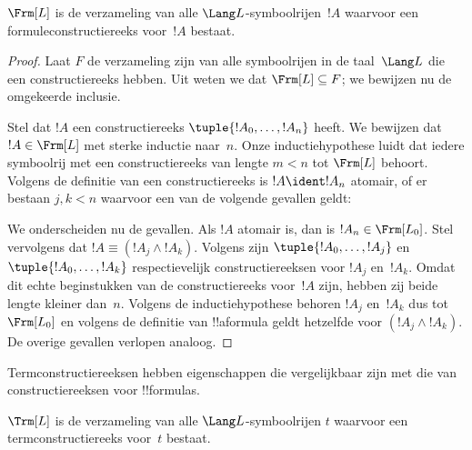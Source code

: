 \documentclass[../../../include/open-logic-section]{subfiles}
\begin{document}
\begin{thm}
$\Frm[L]$ is de verzameling van alle $\Lang L$-symboolrijen~$!A$
waarvoor een formuleconstructiereeks voor~$!A$ bestaat.
\end{thm}

\begin{proof}
Laat $F$ de verzameling zijn van alle symboolrijen in de taal~$\Lang L$
die een constructiereeks hebben. Uit
 weten we dat $\Frm[L] \subseteq F$;
we bewijzen nu de omgekeerde inclusie.

Stel dat $!A$ een constructiereeks $\tuple{!A_0,\dotsc,!A_n}$ heeft.
We bewijzen dat $!A \in \Frm[L]$ met sterke inductie naar~$n$.
Onze inductiehypothese luidt dat iedere symboolrij met een
constructiereeks van lengte $m < n$ tot $\Frm[L]$ behoort.
Volgens de definitie van een constructiereeks is $!A \ident !A_n$
atomair, of er bestaan $j,k < n$ waarvoor een van de volgende gevallen
geldt:
\begin{enumerate}
\end{enumerate}
We onderscheiden nu de gevallen. Als $!A$ atomair is, dan is
$!A_n \in \Frm[L_0]$. Stel vervolgens dat
$!A \equiv (!A_j \land !A_k)$. Volgens
 zijn
$\tuple{!A_0,\dotsc,!A_j}$ en $\tuple{!A_0,\dotsc,!A_k}$
respectievelijk constructiereeksen voor $!A_j$ en~$!A_k$. Omdat dit
echte beginstukken van de constructiereeks voor~$!A$ zijn, hebben zij
beide lengte kleiner dan~$n$. Volgens de inductiehypothese behoren
$!A_j$ en~$!A_k$ dus tot~$\Frm[L_0]$ en volgens de definitie van
!!a{formula} geldt hetzelfde voor $(!A_j \land !A_k)$. De overige
gevallen verlopen analoog.
\end{proof}

Termconstructiereeksen hebben eigenschappen die vergelijkbaar zijn met
die van constructiereeksen voor !!{formula}s.

\begin{prop}
$\Trm[L]$ is de verzameling van alle $\Lang L$-symboolrijen $t$
waarvoor een termconstructiereeks voor~$t$ bestaat.
\end{prop}
\end{document}
